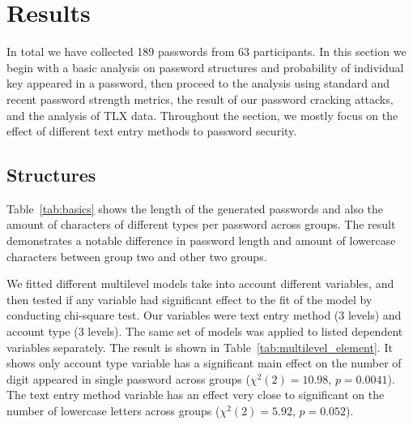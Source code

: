 \documentclass[conference]{IEEEtran}
\begin{document}
\section{Results}

In total we have collected 189 passwords from 63 participants. In this section we begin with a basic analysis on password structures and probability of individual key appeared in a password, then proceed to the analysis using standard and recent password strength metrics, the result of our password cracking attacks, and the analysis of TLX data. Throughout the section, we mostly focus on the effect of different text entry methods to password security.

\subsection{Structures}

Table~\ref{tab:basics} shows the length of the generated passwords and also the amount of characters of different types per password across groups. The result demonstrates a notable difference in password length and amount of lowercase characters between group two and other two groups.




\begin{table}[tbph]
\begin{center}
  \caption{The mean of password length, amount of characters of different types per password across groups.}
    \label{tab:basics}
\end{center}
\end{table}

We fitted different multilevel models take into account different variables, and then tested if any variable had significant effect to the fit of the model by conducting chi-square test. Our variables were text entry method (3 levels) and account type (3 levels). The same set of models was applied to listed dependent variables separately. The result is shown in Table~\ref{tab:multilevel_element}. It shows only account type variable has a significant main effect on the number of digit appeared in single password across groups ($\chi^{2}(2)=10.98$, $p=0.0041$). The text entry method variable has an effect very close to significant on the number of lowercase letters across groups ($\chi^{2}(2)=5.92$, $p=0.052$). 
\end{document}
